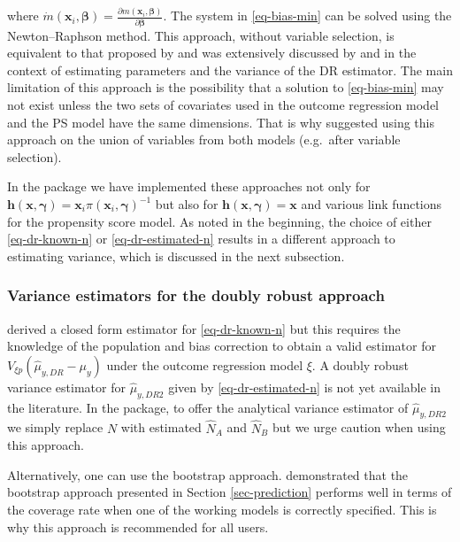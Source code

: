 \documentclass[
]{jss}
\begin{document}
where
\(\dot{m}\left(\boldsymbol{x}_i, \boldsymbol{\beta}\right)=\frac{\partial m\left(\boldsymbol{x}_i, \boldsymbol{\beta}\right)}{\partial \boldsymbol{\beta}}\).
The system in \eqref{eq-bias-min} can be solved using the
Newton--Raphson method. This approach, without variable selection, is
equivalent to that proposed by \citet{kim2014doubly} and was extensively
discussed by \citet{chen2020doubly} and \citet{wu2022statistical} in the
context of estimating parameters and the variance of the DR estimator.
The main limitation of this approach is the possibility that a solution
to \eqref{eq-bias-min} may not exist unless the two sets of covariates
used in the outcome regression model and the PS model have the same
dimensions. That is why \citet{yang_doubly_2020} suggested using this
approach on the union of variables from both models (e.g.~after variable
selection).

In the  package we have implemented these approaches not
only for
\(\boldsymbol{h}(\boldsymbol{x}, \boldsymbol{\gamma})=\boldsymbol{x}_i \pi\left(\boldsymbol{x}_i, \boldsymbol{\gamma}\right)^{-1}\)
but also for
\(\boldsymbol{h}(\boldsymbol{x}, \boldsymbol{\gamma})=\boldsymbol{x}\)
and various link functions for the propensity score model. As noted in
the beginning, the choice of either \eqref{eq-dr-known-n} or
\eqref{eq-dr-estimated-n} results in a different approach to estimating
variance, which is discussed in the next subsection.

\subsubsection{Variance estimators for the doubly robust
approach}\label{variance-estimators-for-the-doubly-robust-approach}

\citet{yang_doubly_2020} derived a closed form estimator for
\eqref{eq-dr-known-n} but this requires the knowledge of the population
and bias correction to obtain a valid estimator for
\(V_{\xi p}\left(\hat{\mu}_{y,DR}-\mu_y\right)\) under the outcome
regression model \(\xi\). A doubly robust variance estimator for
\(\hat{\mu}_{y,DR2}\) given by \eqref{eq-dr-estimated-n} is not yet
available in the literature. In the package, to offer the analytical
variance estimator of \(\hat{\mu}_{y,DR2}\) we simply replace \(N\) with
estimated \(\hat{N}_A\) and \(\hat{N}_B\) but we urge caution when using
this approach.

Alternatively, one can use the bootstrap approach.
\citet{chen2020doubly} demonstrated that the bootstrap approach
presented in Section \ref{sec-prediction} performs well in terms of the
coverage rate when one of the working models is correctly specified.
This is why this approach is recommended for all users.
\end{document}
